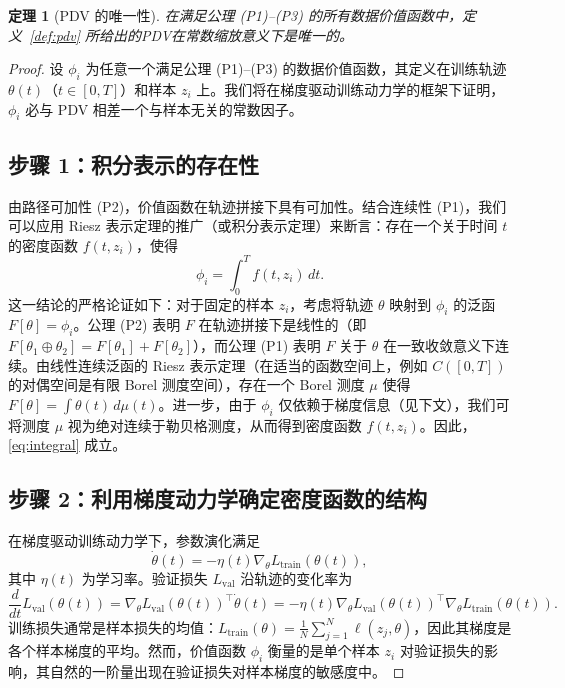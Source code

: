 \documentclass[12pt,a4paper]{ctexart}
\theoremstyle{definition}
\theoremstyle{plain}
\newtheorem{theorem}{定理}[section]
\begin{document}
\begin{theorem}[PDV 的唯一性]
\label{thm:pdv_unique}
在满足公理 (P1)--(P3) 的所有数据价值函数中，定义~\ref{def:pdv} 所给出的PDV在常数缩放意义下是唯一的。
\end{theorem}

\begin{proof}
设 $\phi_i$ 为任意一个满足公理 (P1)--(P3) 的数据价值函数，其定义在训练轨迹 $\theta(t)$（$t\in[0,T]$）和样本 $z_i$ 上。我们将在梯度驱动训练动力学的框架下证明，$\phi_i$ 必与 PDV 相差一个与样本无关的常数因子。

\subsection*{步骤 1：积分表示的存在性}
由路径可加性 (P2)，价值函数在轨迹拼接下具有可加性。结合连续性 (P1)，我们可以应用 Riesz 表示定理的推广（或积分表示定理）来断言：存在一个关于时间 $t$ 的密度函数 $f(t,z_i)$，使得
\begin{equation}
\phi_i = \int_0^T f(t, z_i) \, dt.
\label{eq:integral}
\end{equation}
这一结论的严格论证如下：对于固定的样本 $z_i$，考虑将轨迹 $\theta$ 映射到 $\phi_i$ 的泛函 $F[\theta] = \phi_i$。公理 (P2) 表明 $F$ 在轨迹拼接下是线性的（即 $F[\theta_1 \oplus \theta_2] = F[\theta_1] + F[\theta_2]$），而公理 (P1) 表明 $F$ 关于 $\theta$ 在一致收敛意义下连续。由线性连续泛函的 Riesz 表示定理（在适当的函数空间上，例如 $C([0,T])$ 的对偶空间是有限 Borel 测度空间），存在一个 Borel 测度 $\mu$ 使得 $F[\theta] = \int \theta(t) \, d\mu(t)$。进一步，由于 $\phi_i$ 仅依赖于梯度信息（见下文），我们可将测度 $\mu$ 视为绝对连续于勒贝格测度，从而得到密度函数 $f(t,z_i)$。因此，\eqref{eq:integral} 成立。

\subsection*{步骤 2：利用梯度动力学确定密度函数的结构}
在梯度驱动训练动力学下，参数演化满足
\[
\dot{\theta}(t) = -\eta(t) \nabla_\theta L_{\text{train}}(\theta(t)),
\]
其中 $\eta(t)$ 为学习率。验证损失 $L_{\text{val}}$ 沿轨迹的变化率为
\[
\frac{d}{dt} L_{\text{val}}(\theta(t)) = \nabla_\theta L_{\text{val}}(\theta(t))^\top \dot{\theta}(t)
= -\eta(t) \nabla_\theta L_{\text{val}}(\theta(t))^\top \nabla_\theta L_{\text{train}}(\theta(t)).
\]
训练损失通常是样本损失的均值：$L_{\text{train}}(\theta) = \frac{1}{N} \sum_{j=1}^N \ell(z_j,\theta)$，因此其梯度是各个样本梯度的平均。然而，价值函数 $\phi_i$ 衡量的是单个样本 $z_i$ 对验证损失的影响，其自然的一阶量出现在验证损失对样本梯度的敏感度中。


\end{proof}
\end{document}
